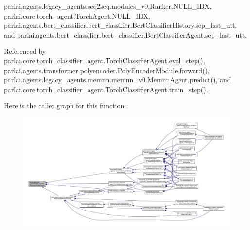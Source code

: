 parlai.\+agents.\+legacy\+\_\+agents.\+seq2seq.\+modules\+\_\+v0.\+Ranker.\+N\+U\+L\+L\+\_\+\+I\+DX, parlai.\+core.\+torch\+\_\+agent.\+Torch\+Agent.\+N\+U\+L\+L\+\_\+\+I\+DX, parlai.\+agents.\+bert\+\_\+classifier.\+bert\+\_\+classifier.\+Bert\+Classifier\+History.\+sep\+\_\+last\+\_\+utt, and parlai.\+agents.\+bert\+\_\+classifier.\+bert\+\_\+classifier.\+Bert\+Classifier\+Agent.\+sep\+\_\+last\+\_\+utt.



Referenced by parlai.\+core.\+torch\+\_\+classifier\+\_\+agent.\+Torch\+Classifier\+Agent.\+eval\+\_\+step(), parlai.\+agents.\+transformer.\+polyencoder.\+Poly\+Encoder\+Module.\+forward(), parlai.\+agents.\+legacy\+\_\+agents.\+memnn.\+memnn\+\_\+v0.\+Memnn\+Agent.\+predict(), and parlai.\+core.\+torch\+\_\+classifier\+\_\+agent.\+Torch\+Classifier\+Agent.\+train\+\_\+step().

Here is the caller graph for this function\+:
\nopagebreak
\begin{figure}[H]
\begin{center}
\leavevmode
\includegraphics[width=350pt]{classparlai_1_1agents_1_1bert__classifier_1_1bert__classifier_1_1BertClassifierAgent_a2fa163d78b44698fa35a491e9a7a6207_icgraph}
\end{center}
\end{figure}
\mbox{\label{classparlai_1_1agents_1_1bert__classifier_1_1bert__classifier_1_1BertClassifierAgent_a2eabac94b73fb53be7e7b05ccc788621}} 

